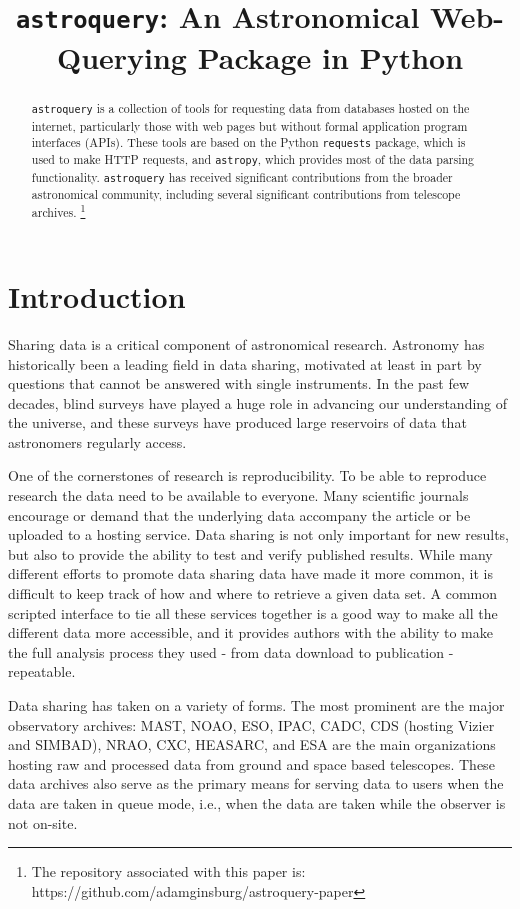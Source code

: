 \documentclass[twocolumn]{aastex61}
\newcommand{\package}[1]{\texttt{#1}\xspace}
\newcommand{\astroquery}{\package{astroquery}}
\newcommand{\astropypkg}{\package{astropy}}
\begin{document}


\title{\astroquery: An Astronomical Web-Querying Package in Python}

\begin{abstract}
\astroquery is a collection of tools for requesting data from databases hosted
on the internet, particularly those with web pages but without formal
application program interfaces (APIs).  These tools are based on the Python
\package{requests} package, which is used to make HTTP requests, and \astropypkg, which
provides most of the data parsing functionality. \astroquery has received
significant contributions from the broader astronomical community, including
several significant contributions from telescope archives.
\footnote{
The repository associated with this paper is:
https://github.com/adamginsburg/astroquery-paper
}
\end{abstract}


\section{Introduction}
Sharing data is a critical component of astronomical research.  Astronomy
has historically been a leading field in data sharing, motivated at least
in part by questions that cannot be answered with single instruments.
In the past few decades, blind surveys have played a huge role in advancing our
understanding of the universe, and these surveys have produced large reservoirs
of data that astronomers regularly access.

One of the cornerstones of research is reproducibility. To be able to reproduce
research the  data need to be available to everyone. Many scientific journals
encourage or demand that the underlying data  accompany the article or be
uploaded to a hosting service. Data sharing is not only important for new
results, but also to provide the ability to test and verify published results.
While many different efforts to promote data sharing data have made it more
common, it is difficult to keep track of how and where to retrieve a given data
set. A common scripted interface to tie all these services together is a good
way to make all the different data more accessible, and it provides authors
with the ability to make the full analysis process they used - from data
download to publication - repeatable.

Data sharing has taken on a variety of forms.  The most prominent are the major
observatory archives: MAST, NOAO, ESO, IPAC, CADC, CDS (hosting Vizier and
SIMBAD), NRAO, CXC, HEASARC, and ESA are the main
organizations hosting raw and processed data from ground and space based
telescopes.  These data archives also serve as the primary means for serving data
to users when the data are taken in queue mode, i.e., when the data are taken
while the observer is not on-site.
\end{document}
